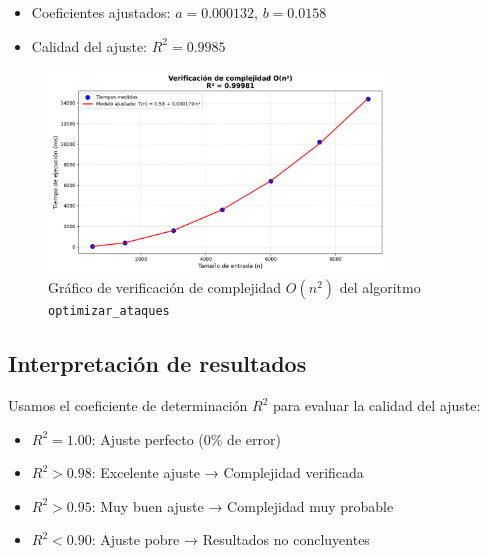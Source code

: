 \begin{itemize}
    \item Coeficientes ajustados: $a = 0.000132$, $b = 0.0158$ 
    \item Calidad del ajuste: $R^2 = 0.9985$
\end{itemize}

\begin{figure}[H]
    \centering
    \includegraphics[width=0.8\textwidth]{./img/verificacion_complejidad_n2.png}
    \caption{Gráfico de verificación de complejidad $O(n^2)$ del algoritmo \texttt{optimizar\_ataques}}
\end{figure}

\subsection{Interpretación de resultados}

Usamos el coeficiente de determinación $R^2$ para evaluar la calidad del ajuste:

\begin{itemize}
    \item $R^2 = 1.00$: Ajuste perfecto (0\% de error)
    \item $R^2 > 0.98$: Excelente ajuste → Complejidad verificada
    \item $R^2 > 0.95$: Muy buen ajuste → Complejidad muy probable
    \item $R^2 < 0.90$: Ajuste pobre → Resultados no concluyentes
\end{itemize}